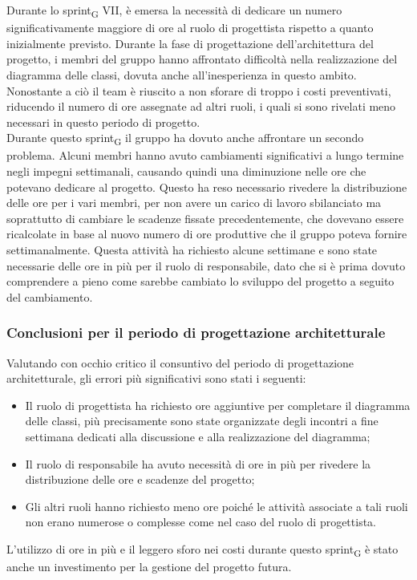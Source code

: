 Durante lo sprint\textsubscript{G} VII, è emersa la necessità di dedicare un numero significativamente maggiore di ore al ruolo di progettista rispetto a quanto inizialmente previsto. Durante la fase di progettazione dell'architettura del progetto, i membri del gruppo hanno affrontato difficoltà nella realizzazione del diagramma delle classi, dovuta anche all'inesperienza in questo ambito. Nonostante a ciò il team è riuscito a non sforare di troppo i costi preventivati, riducendo il numero di ore assegnate ad altri ruoli, i quali si sono rivelati meno necessari in questo periodo di progetto. \\
Durante questo sprint\textsubscript{G} il gruppo ha dovuto anche affrontare un secondo problema. Alcuni membri hanno avuto cambiamenti significativi a lungo termine negli impegni settimanali, causando quindi una diminuzione nelle ore che potevano dedicare al progetto. Questo ha reso necessario rivedere la distribuzione delle ore per i vari membri, per non avere un carico di lavoro sbilanciato ma soprattutto di cambiare le scadenze fissate precedentemente, che dovevano essere ricalcolate in base al nuovo numero di ore produttive che il gruppo poteva fornire settimanalmente. Questa attività ha richiesto alcune settimane e sono state necessarie delle ore in più per il ruolo di responsabile, dato che si è prima dovuto comprendere a pieno come sarebbe cambiato lo sviluppo del progetto a seguito del cambiamento. 

\subsubsection{Conclusioni per il periodo di progettazione architetturale}

Valutando con occhio critico il consuntivo del periodo di progettazione architetturale, gli errori più significativi sono stati i seguenti:
\begin{itemize}
	\item Il ruolo di progettista ha richiesto ore aggiuntive per completare il diagramma delle classi, più precisamente sono state organizzate degli incontri a fine settimana dedicati alla discussione e alla realizzazione del diagramma;
	\item Il ruolo di responsabile ha avuto necessità di ore in più per rivedere la distribuzione delle ore e scadenze del progetto;
	\item Gli altri ruoli hanno richiesto meno ore poiché le attività associate a tali ruoli non erano numerose o complesse come nel caso del ruolo di progettista.
\end{itemize}
L'utilizzo di ore in più e il leggero sforo nei costi durante questo sprint\textsubscript{G} è stato anche un investimento per la gestione del progetto futura.


